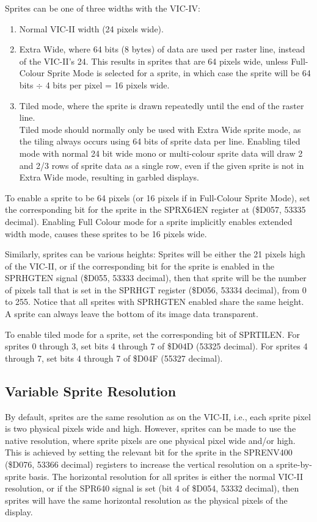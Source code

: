 Sprites can be one of three widths with the VIC-IV:

\begin{enumerate}
\item Normal VIC-II width (24 pixels wide).
\item Extra Wide, where 64 bits (8 bytes) of data are used per raster line, instead of the VIC-II's 24.
  This results in sprites that are 64 pixels wide, unless Full-Colour Sprite Mode is selected for a sprite,
  in which case the sprite will be 64 bits $\div$ 4 bits per pixel = 16 pixels wide.
\item Tiled mode, where the sprite is drawn repeatedly until the end of the raster line. \\
  Tiled mode should normally only be used with Extra Wide sprite mode, as the tiling always occurs using 64 bits of sprite data per line. Enabling tiled mode with normal 24 bit wide mono or multi-colour sprite data will draw 2 and 2/3 rows of sprite data as a single row, even if the given sprite is not in Extra Wide mode, resulting in garbled displays.
\end{enumerate}

To enable a sprite to be 64 pixels (or 16 pixels if in Full-Colour Sprite Mode), set the corresponding bit for the sprite in the SPRX64EN register at (\$D057, 53335 decimal).  Enabling Full Colour mode for a sprite implicitly enables extended width mode, causes these sprites to be 16 pixels wide.

Similarly, sprites can be various heights:  Sprites will be either the 21 pixels high of the VIC-II, or if the corresponding bit for the sprite is enabled in the SPRHGTEN signal (\$D055, 53333 decimal), then that sprite will be the number of pixels tall that is set in the SPRHGT
register (\$D056, 53334 decimal), from 0 to 255. Notice that all sprites with SPRHGTEN enabled share the same height. A sprite can always leave the bottom of its image data transparent.

To enable tiled mode for a sprite, set the corresponding bit of SPRTILEN. For sprites 0 through 3, set bits 4 through 7 of \$D04D (53325 decimal). For sprites 4 through 7, set bits 4 through 7 of \$D04F (55327 decimal).

\subsection{Variable Sprite Resolution}

By default, sprites are the same resolution as on the VIC-II, i.e., each sprite pixel is two physical pixels wide and high.
However, sprites can be made to use the native resolution, where sprite pixels are one physical pixel wide and/or high.
This is achieved by setting the relevant bit for the sprite in the SPRENV400 (\$D076, 53366 decimal) registers to increase the
vertical resolution on a sprite-by-sprite basis.  The horizontal resolution for all sprites is either the normal VIC-II resolution, or if the SPR640 signal
is set (bit 4 of \$D054, 53332 decimal), then sprites will have the same horizontal resolution as the physical pixels of the display.

